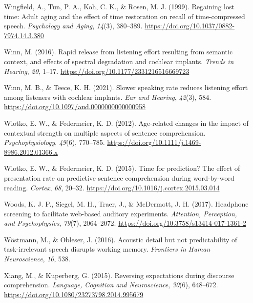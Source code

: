 \documentclass[a4paper, nobind]{templates/ociamthesis}
\newlength{\cslhangindent}
\newenvironment{CSLReferences}[2] %
 {%
  \setlength{\parindent}{0pt}
  \ifodd #1
  \let\oldpar\par
  \def\par{\hangindent=\cslhangindent\oldpar}
  \fi
  \setlength{\parskip}{1mm}
  \setlength{\baselineskip}{6mm}
 }%
 {}
\begin{document}
\begin{CSLReferences}{1}{0}
\leavevmode{}%
Wingfield, A., Tun, P. A., Koh, C. K., \& Rosen, M. J. (1999). {Regaining lost time: Adult aging and the effect of time restoration on recall of time-compressed speech}. \emph{Psychology and Aging}, \emph{14}(3), 380--389. \url{https://doi.org/10.1037/0882-7974.14.3.380}

\leavevmode{}%
Winn, M. (2016). Rapid release from listening effort resulting from semantic context, and effects of spectral degradation and cochlear implants. \emph{Trends in Hearing}, \emph{20}, 1--17. \url{https://doi.org/10.1177/2331216516669723}

\leavevmode{}%
Winn, M. B., \& Teece, K. H. (2021). {Slower speaking rate reduces listening effort among listeners with cochlear implants}. \emph{Ear and Hearing}, \emph{42}(3), 584. \url{https://doi.org/10.1097/aud.0000000000000958}

\leavevmode{}%
Wlotko, E. W., \& Federmeier, K. D. (2012). Age-related changes in the impact of contextual strength on multiple aspects of sentence comprehension. \emph{Psychophysiology}, \emph{49}(6), 770--785. \url{https://doi.org/10.1111/j.1469-8986.2012.01366.x}

\leavevmode{}%
Wlotko, E. W., \& Federmeier, K. D. (2015). {Time for prediction? The effect of presentation rate on predictive sentence comprehension during word-by-word reading}. \emph{Cortex}, \emph{68}, 20--32. \url{https://doi.org/10.1016/j.cortex.2015.03.014}

\leavevmode{}%
Woods, K. J. P., Siegel, M. H., Traer, J., \& McDermott, J. H. (2017). {Headphone screening to facilitate web-based auditory experiments}. \emph{Attention, Perception, and Psychophysics}, \emph{79}(7), 2064--2072. \url{https://doi.org/10.3758/s13414-017-1361-2}

\leavevmode{}%
Wöstmann, M., \& Obleser, J. (2016). Acoustic detail but not predictability of task-irrelevant speech disrupts working memory. \emph{Frontiers in Human Neuroscience}, \emph{10}, 538.

\leavevmode{}%
Xiang, M., \& Kuperberg, G. (2015). {Reversing expectations during discourse comprehension}. \emph{Language, Cognition and Neuroscience}, \emph{30}(6), 648--672. \url{https://doi.org/10.1080/23273798.2014.995679}

\end{CSLReferences}

\end{document}
